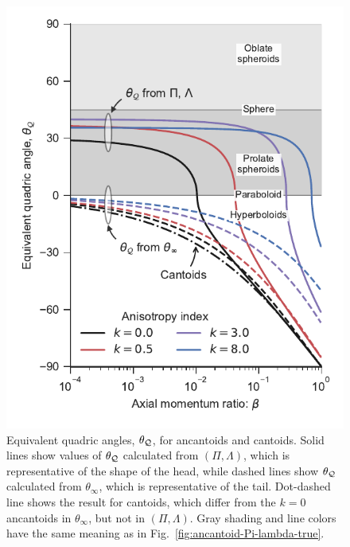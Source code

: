 \begin{figure}
  \centering
  \includegraphics[width=\linewidth]{figs/ancantoid-angles}
  \caption{Equivalent quadric angles, \(\theta_{\mathcal{Q}}\), for ancantoids and
    cantoids.  Solid lines show values of \(\theta_{\mathcal{Q}}\) calculated from
    \((\Pi, \Lambda)\), which is representative of the shape of the head,
    while dashed lines show \(\theta_{\mathcal{Q}}\) calculated from
    \(\theta_\infty\), which is representative of the tail.  Dot-dashed line
    shows the result for cantoids, which differ from the \(k=0\)
    ancantoids in \(\theta_\infty\), but not in \((\Pi, \Lambda)\). Gray shading and
    line colors have the same meaning as in
    Fig.~\ref{fig:ancantoid-Pi-lambda-true}. }
  \label{fig:ancantoid-angles}
\end{figure}



